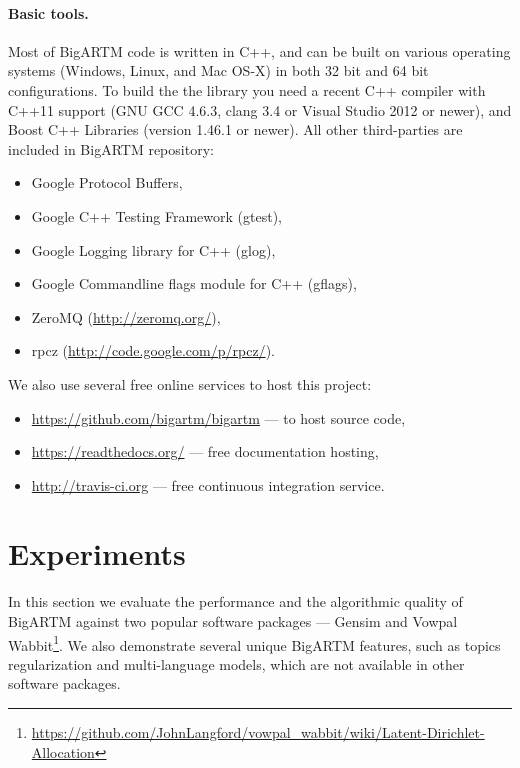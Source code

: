 \documentclass[russian]{llncs}
\begin{document}
\paragraph{Basic tools.}
Most of BigARTM code is written in C++,
and can be built on various operating systems (Windows, Linux, and Mac OS-X)
in both 32 bit and 64 bit configurations.
To build the the library you need a recent C++ compiler with C++11 support (GNU GCC 4.6.3, clang 3.4 or Visual Studio 2012 or newer),
and Boost C++ Libraries (version 1.46.1 or newer).
All other third-parties are included in BigARTM repository:
\begin{itemize}
\item Google Protocol Buffers,
\item Google C++ Testing Framework (gtest),
\item Google Logging library for C++ (glog),
\item Google Commandline flags module for C++ (gflags),
\item ZeroMQ (\url{http://zeromq.org/}),
\item rpcz (\url{http://code.google.com/p/rpcz/}).
\end{itemize}
We also use several free online services to host this project:
\begin{itemize}
\item \url{https://github.com/bigartm/bigartm} --- to host source code,
\item \url{https://readthedocs.org/} --- free documentation hosting,
\item \url{http://travis-ci.org} --- free continuous integration service.
\end{itemize}

\section{Experiments}
\label{sec:Experiments}

In this section we evaluate the performance and the algorithmic quality of \mbox{BigARTM} against two popular software packages ---
Gensim \cite{rehurek_lrec}  %
and Vowpal Wabbit\footnote{\url{https://github.com/JohnLangford/vowpal_wabbit/wiki/Latent-Dirichlet-Allocation}}.
We also demonstrate several unique BigARTM features, such as topics regularization and multi-language models,
which are not available in other software packages.
\end{document}

